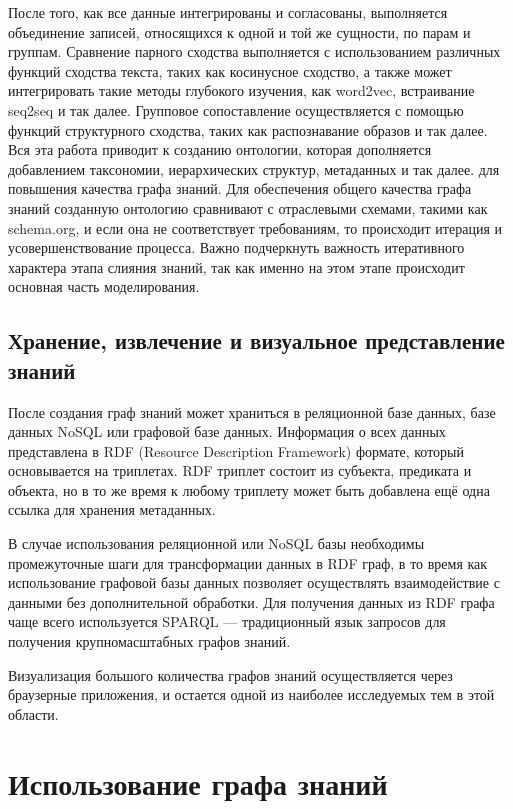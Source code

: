 После того, как все данные интегрированы и согласованы, выполняется объединение записей, относящихся к одной и той же сущности, по парам и группам. Сравнение парного сходства выполняется с использованием различных функций сходства текста, таких как косинусное сходство, а также может интегрировать такие методы глубокого изучения, как word2vec, встраивание seq2seq и так далее. Групповое сопоставление осуществляется с помощью функций структурного сходства, таких как распознавание образов и так далее. Вся эта работа приводит к созданию онтологии, которая дополняется добавлением таксономии, иерархических структур, метаданных и так далее. для повышения качества графа знаний. Для обеспечения общего качества графа знаний созданную онтологию сравнивают с отраслевыми схемами, такими как schema.org, и если она не соответствует требованиям, то происходит итерация и усовершенствование процесса. Важно подчеркнуть важность итеративного характера этапа слияния знаний, так как именно на этом этапе происходит основная часть моделирования.

\subsection{Хранение, извлечение и визуальное представление знаний}

После создания граф знаний может храниться в реляционной базе данных, базе данных NoSQL или графовой базе данных. Информация о всех данных представлена в RDF (Resource Description Framework) формате, который основывается на триплетах. RDF триплет состоит из субъекта, предиката и объекта, но в то же время к любому триплету может быть добавлена ещё одна ссылка для хранения метаданных.

В случае использования реляционной или NoSQL базы необходимы промежуточные шаги для трансформации данных в RDF граф, в то время как использование графовой базы данных позволяет осуществлять взаимодействие с данными без дополнительной обработки. Для получения данных из RDF графа чаще всего используется SPARQL — традиционный язык запросов для получения крупномасштабных графов знаний.

Визуализация большого количества графов знаний осуществляется через браузерные приложения, и остается одной из наиболее исследуемых тем в этой области.


\section{Использование графа знаний}

